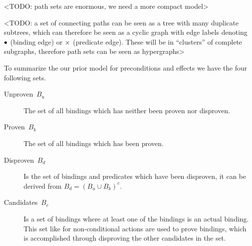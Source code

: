 \documentclass[../Master.tex]{subfiles}
\begin{document}
\providecommand{\master}{..}

<TODO: path sets are enormous, we need a more compact model>

<TODO: a set of connecting paths can be seen as a tree with many duplicate subtrees, which can therefore be seen as a cyclic graph with edge labels denoting $\bullet$ (binding edge) or $\times$ (predicate edge). These will be in ``clusters'' of complete subgraphs, therefore path sets can be seen as hypergraphs>

%
%
%

To summarize the our prior model for preconditions and effects we have the four following sets.
\begin{description}
	\item [{Unproven~$B_u$}] The set of all bindings which has
	neither been proven nor disproven.
	\item [{Proven~$B_k$}] The set of all bindings which has been
	proven.
	\item [{Disproven~$B_d$}] Is the set of bindings and predicates which have
	been disproven, it can be derived from $B_d={\left( B_u \cup B_k \right)}^c$.
	\item [{Candidates~$B_c$}] Is a set of bindings where at least one of the bindings is an actual binding.
	This set like for non-conditional actions are used to prove bindings,
	which is accomplished through disproving the other candidates in the set.
\end{description}
\end{document}

